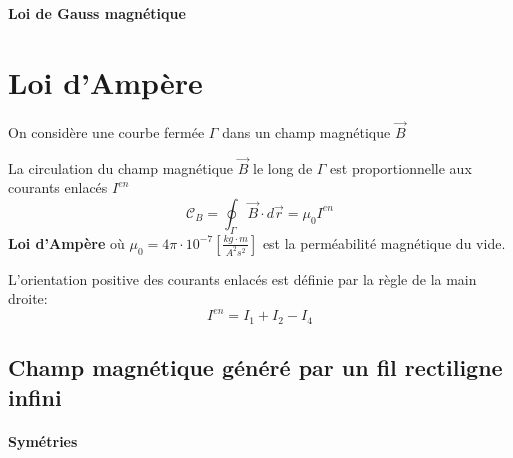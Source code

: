 \documentclass[
    11pt,
    a4paper,
    oneside,
    headinlcude, footinclude,
    twoside,
]{report}
\renewcommand{\vec}[1]{\overrightarrow{#1}}
\begin{document}
\textbf{Loi de Gauss magnétique}

\section{Loi d'Ampère}
\label{sec:loi_d_ampere}

On considère une courbe fermée $\Gamma$ dans un champ magnétique $\vec B$

\begin{center}
    \begin{minipage}{.5\linewidth}
    \end{minipage}
    \begin{minipage}{.49\linewidth}
        \setlength{\parskip}{.3em}
        La circulation du champ magnétique $\vec B$ le long de $\Gamma$ est
        proportionnelle aux courants enlacés $I^{en}$
        \begin{equation}
            \label{eq:9.15} 
            \mathcal{C}_B = \oint_{\Gamma} \vec B \cdot d \vec r = \mu_0 I^{en}
        \end{equation}
        \textbf{Loi d'Ampère} 
        où $\mu_0 = 4 \pi \cdot 10^{-7} \left[\frac{kg \cdot m}{A^2 s^2}\right]$
        est la perméabilité magnétique du vide.
    \end{minipage}
\end{center}

\begin{center}
    \begin{minipage}{.5\linewidth}
    \end{minipage}
    \begin{minipage}{.49\linewidth}
        \setlength{\parskip}{.3em}
        L'orientation positive des courants enlacés est définie par la règle de
        la main droite:
        $$I^{en} = I_1 + I_2 - I_4$$
    \end{minipage}
\end{center}


\subsection{Champ magnétique généré par un fil rectiligne infini}


\paragraph{Symétries}
\label{par:symetries}
\end{document}
